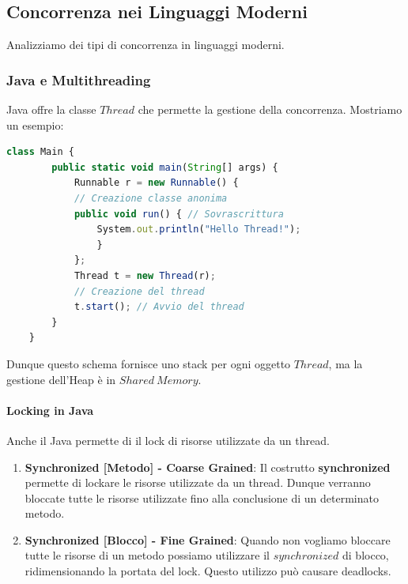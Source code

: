 \documentclass{article}
\begin{document}
\newpage

\subsection{Concorrenza nei Linguaggi Moderni}

Analizziamo dei tipi di concorrenza in linguaggi moderni.

\subsubsection{Java e Multithreading}

Java offre la classe $Thread$ che permette la gestione della concorrenza. Mostriamo un esempio:

\vspace*{10px}
\begin{lstlisting}[language = JavaScript]
    class Main {
        public static void main(String[] args) {
            Runnable r = new Runnable() {
            // Creazione classe anonima
            public void run() { // Sovrascrittura
                System.out.println("Hello Thread!");
                }
            };
            Thread t = new Thread(r);
            // Creazione del thread
            t.start(); // Avvio del thread
        }
    }
\end{lstlisting}
\vspace*{-15px}

Dunque questo schema fornisce uno stack per ogni oggetto $Thread$, ma la gestione dell'Heap è in $Shared \: Memory$.

\paragraph{Locking in Java} Anche il Java permette di il lock di risorse utilizzate da un thread.

\begin{enumerate}
    \item \textbf{Synchronized [Metodo] - Coarse Grained}: Il costrutto \textbf{synchronized} permette di lockare le risorse utilizzate da un thread. Dunque verranno bloccate tutte le risorse utilizzate fino alla conclusione di un determinato metodo.
    \item \textbf{Synchronized [Blocco] - Fine Grained}: Quando non vogliamo bloccare tutte le risorse di un metodo possiamo utilizzare il $synchronized$ di blocco, ridimensionando la portata del lock. Questo utilizzo può causare deadlocks.
\end{enumerate}
\end{document}
